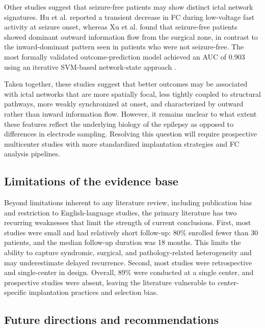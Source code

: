 \documentclass[12pt]{article}
\begin{document}
Other studies suggest that seizure-free patients may show distinct ictal network signatures. Hu et al. \cite{Hu2023-kr} reported a transient decrease in FC during low-voltage fast activity at seizure onset, whereas Xu et al. \cite{Xu2023-rm} found that seizure-free patients showed dominant outward information flow from the surgical zone, in contrast to the inward-dominant pattern seen in patients who were not seizure-free. The most formally validated outcome-prediction model achieved an AUC of 0.903 using an iterative SVM-based network-state approach \cite{Ivankovic2025-ng}.

Taken together, these studies suggest that better outcomes may be associated with ictal networks that are more spatially focal, less tightly coupled to structural pathways, more weakly synchronized at onset, and characterized by outward rather than inward information flow. However, it remains unclear to what extent these features reflect the underlying biology of the epilepsy as opposed to differences in electrode sampling. Resolving this question will require prospective multicenter studies with more standardized implantation strategies and FC analysis pipelines.


\subsection{Limitations of the evidence base}
Beyond limitations inherent to any literature review, including publication bias and restriction to English-language studies, the primary literature has two recurring weaknesses that limit the strength of current conclusions. First, most studies were small and had relatively short follow-up: 80\% enrolled fewer than 30 patients, and the median follow-up duration was 18 months. This limits the ability to capture syndromic, surgical, and pathology-related heterogeneity and may underestimate delayed recurrence. Second, most studies were retrospective and single-center in design. Overall, 89\% were conducted at a single center, and prospective studies were absent, leaving the literature vulnerable to center-specific implantation practices and selection bias.


\subsection{Future directions and recommendations}
\end{document}
